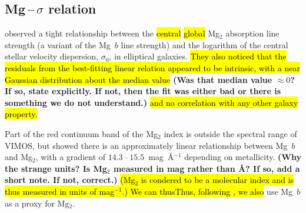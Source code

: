 \documentclass[a4paper,fleqn,usenatbib]{mnras}
\DeclareRobustCommand{\removed}[1]{{\sethlcolor{red}\hl{#1}}}
\DeclareRobustCommand{\added}[1]{{\sethlcolor{green}\hl{#1}}}
\begin{document}
\subsection{Mg\,--\,$\sigma$ relation}
\label{subsec:Mg-sigma}


\citet{Bender1993} observed a tight relationship between the \added{central} \removed{global}
Mg$_2$ absorption line strength (a variant of the Mg~$b$ line
strength) and the logarithm of the central stellar velocity
dispersion, $\sigma_0$, in elliptical galaxies. \removed{They also noticed that
the residuals from the best-fitting linear relation appeared to be
intrinsic, with a near Gaussian distribution about the median value}
{\bf (Was that median value $\approx0$? If so, state explicitly. If
  not, then the fit was either bad or there is something we do not
  understand.)} \removed{and no correlation with any other galaxy property.}

Part of the red continuum band of the Mg$_2$ index is outside the
spectral range of VIMOS, but \citet{Ziegler1997} showed there is an
approximately linear relationship between Mg~$b$ and Mg$_2$, with a
gradient of $14.3$\,--\,$15.5$~mag~\AA$^{-1}$ depending on
metallicity. {\bf (Why the strange units? Is Mg$_2$ measured in mag 
rather than \AA? If so, add a short note. If not, correct.)} 
\added{(Mg$_2$ is condered to be a molecular index and is thus measured 
in units of mag$^{-1}$.) We can thus}\removed{Thus, following \citet{Ziegler1997}, we also} use Mg~$b$ as a proxy for
Mg$_2$.
\end{document}
